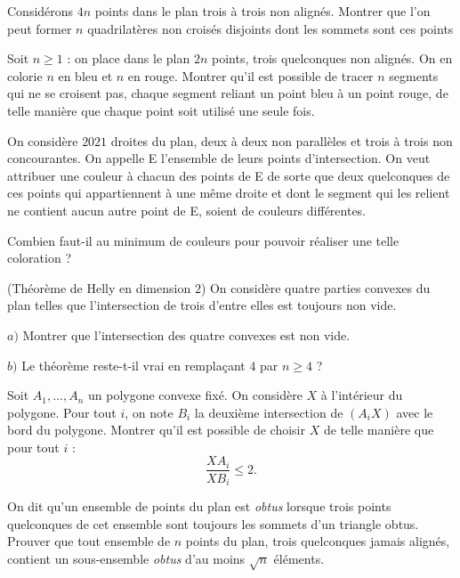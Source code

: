 \begin{exo}
Considérons $4n$ points dans le plan trois à trois non alignés. Montrer que l'on peut former $n$ quadrilatères non croisés disjoints dont les sommets sont ces points
\end{exo}

\begin{exo}
Soit $n\ge 1$ : on place dans le plan $2n$ points, trois quelconques non alignés. On en colorie $n$ en bleu et $n$ en rouge. Montrer qu’il est possible de tracer $n$ segments qui ne se croisent pas, chaque segment reliant un point bleu à un point rouge, de telle manière que chaque point soit utilisé une seule fois.
\end{exo}

\begin{exo}
On considère $2021$ droites du plan, deux à deux non parallèles et trois à trois non concourantes. On appelle E l’ensemble de leurs points d’intersection. On veut attribuer une couleur à chacun des points de E de sorte que deux quelconques de ces points qui appartiennent à une même droite et dont le segment qui les relient ne contient aucun autre point de E, soient de couleurs différentes.

Combien faut-il au minimum de couleurs pour pouvoir réaliser une telle coloration ?
\end{exo}

\begin{exo}
(Théorème de Helly en dimension $2$) On considère quatre parties convexes du plan telles que l’intersection de trois d’entre elles est toujours non vide.

$a)$ Montrer que l’intersection des quatre convexes est non vide.

$b)$ Le théorème reste-t-il vrai en remplaçant $4$ par $n \ge 4$ ?
\end{exo}

\begin{exo}
Soit $A_1,\ldots,A_n$ un polygone convexe fixé. On considère $X$ à l’intérieur du polygone. Pour tout $i$, on note $B_i$ la deuxième intersection de $(A_iX)$ avec le bord du polygone. Montrer qu’il est possible de choisir $X$ de telle manière que pour tout $i$ :
$$\frac{XA_i}{XB_i}\le 2.$$
\end{exo}

\begin{exo}
On dit qu’un ensemble de points du plan est \textit{obtus} lorsque trois points quelconques de cet ensemble sont toujours les sommets d’un triangle obtus. Prouver que tout ensemble de $n$ points du plan, trois quelconques jamais alignés, contient un sous-ensemble \textit{obtus} d’au moins $\sqrt n$ éléments.
\end{exo}


